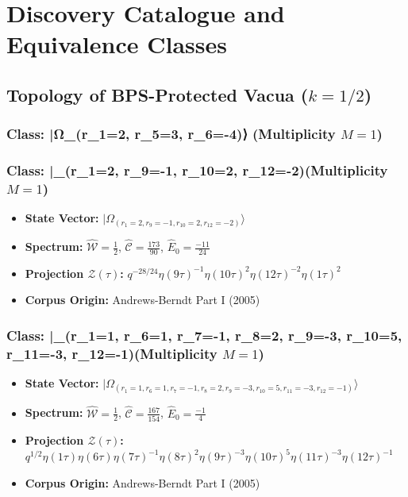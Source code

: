 \documentclass[11pt,twoside,openright]{book}
\begin{document}
\part{Discovery Catalogue and Equivalence Classes}

\chapter{Topology of BPS-Protected Vacua ($k = 1/2$)}
\section*{Class: |Ω_(r_1=2, r_5=3, r_6=-4)⟩ (Multiplicity $M=1$)}

\section*{Class: |\Omega_{(r_{1}=2, r_{9}=-1, r_{10}=2, r_{12}=-2)}\rangle (Multiplicity $M=1$)}
\begin{itemize}
  \item \textbf{State Vector:} $|\Omega_{(r_{1}=2, r_{9}=-1, r_{10}=2, r_{12}=-2)}\rangle$
  \item \textbf{Spectrum:} $\hat{\mathcal{W}} = \frac{1}{2}$, $\hat{\mathcal{C}} = \frac{173}{90}$, $\hat{E}_0 = \frac{-11}{24}$
  \item \textbf{Projection $\mathcal{Z}(\tau)$:} $q^{-28/24} \eta(9\tau)^{-1} \eta(10\tau)^{2} \eta(12\tau)^{-2} \eta(1\tau)^{2}$
  \item \textbf{Corpus Origin:} Andrews-Berndt Part I (2005)
\end{itemize}

\section*{Class: |\Omega_{(r_{1}=1, r_{6}=1, r_{7}=-1, r_{8}=2, r_{9}=-3, r_{10}=5, r_{11}=-3, r_{12}=-1)}\rangle (Multiplicity $M=1$)}
\begin{itemize}
  \item \textbf{State Vector:} $|\Omega_{(r_{1}=1, r_{6}=1, r_{7}=-1, r_{8}=2, r_{9}=-3, r_{10}=5, r_{11}=-3, r_{12}=-1)}\rangle$
  \item \textbf{Spectrum:} $\hat{\mathcal{W}} = \frac{1}{2}$, $\hat{\mathcal{C}} = \frac{167}{154}$, $\hat{E}_0 = \frac{-1}{4}$
  \item \textbf{Projection $\mathcal{Z}(\tau)$:} $q^{1/2} \eta(1\tau) \eta(6\tau) \eta(7\tau)^{-1} \eta(8\tau)^{2} \eta(9\tau)^{-3} \eta(10\tau)^{5} \eta(11\tau)^{-3} \eta(12\tau)^{-1}$
  \item \textbf{Corpus Origin:} Andrews-Berndt Part I (2005)
\end{itemize}
\end{document}
